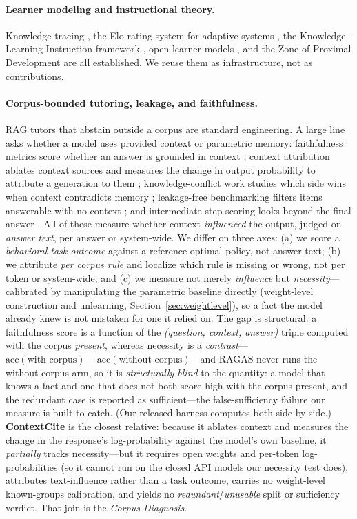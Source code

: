 \documentclass{article}
\begin{document}
\paragraph{Learner modeling and instructional theory.} Knowledge tracing
\citep{corbett1994bkt}, the Elo rating system for adaptive systems \citep{pelanek2016}, the
Knowledge-Learning-Instruction framework \citep{koedinger2012kli}, open learner models
\citep{bull2007olm}, and the Zone of Proximal Development \citep{vygotsky1978} are all
established. We reuse them as infrastructure, not as contributions.

\paragraph{Corpus-bounded tutoring, leakage, and faithfulness.} RAG tutors that abstain
outside a corpus are standard engineering. A large line asks whether a model uses provided
context or parametric memory: faithfulness metrics score whether an answer is grounded in
context \citep{ragas2023}; context attribution ablates context sources and measures the
change in output probability to attribute a generation to them \citep{contextcite2024,
priordominance2026}; knowledge-conflict work studies which side wins when context contradicts
memory \citep{knowledgeconflicts2024, faithfulrag2025}; leakage-free benchmarking filters
items answerable with no context \citep{seedrg2026}; and intermediate-step scoring looks
beyond the final answer \citep{cuer2026}. All of these measure whether context
\emph{influenced} the output, judged on \emph{answer text}, per answer or system-wide. We
differ on three axes: (a) we score a \emph{behavioral task outcome} against a reference-optimal
policy, not answer text; (b) we attribute \emph{per corpus rule} and localize which rule is
missing or wrong, not per token or system-wide; and (c) we measure not merely \emph{influence}
but \emph{necessity}---calibrated by manipulating the parametric baseline directly (weight-level
construction and unlearning, Section~\ref{sec:weightlevel}), so a fact the model already knew is
not mistaken for one it relied on. The gap is structural: a faithfulness score is a function of the
\emph{(question, context, answer)} triple computed with the corpus \emph{present}, whereas necessity is
a \emph{contrast}---$\mathrm{acc}(\text{with corpus})-\mathrm{acc}(\text{without corpus})$---and RAGAS
never runs the without-corpus arm, so it is \emph{structurally blind} to the quantity: a model that
knows a fact and one that does not both score high with the corpus present, and the redundant case is
reported as sufficient---the false-sufficiency failure our measure is built to catch. (Our released
harness computes both side by side.) \textbf{ContextCite} \citep{contextcite2024} is the closest relative: because
it ablates context and measures the change in the response's log-probability against the model's own
baseline, it \emph{partially} tracks necessity---but it requires open weights and per-token
log-probabilities (so it cannot run on the closed API models our necessity test does), attributes
text-influence rather than a task outcome, carries no weight-level known-groups calibration, and
yields no \emph{redundant}/\emph{unusable} split or sufficiency verdict. That join is the
\emph{Corpus Diagnosis}.
\end{document}
